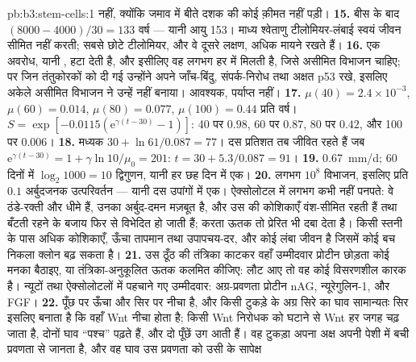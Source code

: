 \begin{solution}{pb:b3:stem-cells:1}
नहीं, क्योंकि जमाव में बीते दशक की कोई क़ीमत नहीं पड़ी।
\textbf{15.} बीस के बाद $(8000 - 4000)/30 = 133$ वर्ष --- यानी आयु 153।
माध्य श्वेताणु टीलोमियर-लंबाई स्वयं जीवन सीमित नहीं करती; सबसे छोटे
टीलोमियर, और वे दूसरे लक्षण, अधिक मायने रखते हैं।
\textbf{16.}  एक अवरोध, यानी , हटा देती है, और
इसीलिए वह लगभग हर  में मिलती है, जिसे असीमित विभाजन चाहिए; पर
जिन तंतुकोरकों को  दी गई उन्होंने अपने जाँच-बिंदु, संपर्क-निरोध
तथा अक्षत p53 रखे, इसलिए अकेले असीमित विभाजन ने उन्हें  नहीं
बनाया। आवश्यक, पर्याप्त नहीं।
\textbf{17.} $\mu(40) = 2.4\times 10^{-3}$, $\mu(60) = 0.014$, $\mu(80) =
0.077$, $\mu(100) = 0.44$ प्रति वर्ष। $S = \exp[-0.0115(\mathrm{e}^{\gamma
(t-30)} - 1)]$: 40 पर $0.98$, 60 पर $0.87$, 80 पर $0.42$, और 100 पर
$0.006$।
\textbf{18.} मध्यक $30 + \ln 61/0.087 = 77$। दस प्रतिशत तब जीवित रहते
हैं जब $\mathrm{e}^{\gamma(t-30)} = 1 + \gamma\ln 10/\mu_{0} = 201$: $t = 30 +
5.3/0.087 = 91$।
\textbf{19.} \qty{0.67}{mm/d}; 60 दिनों में $\log_{2}1000 = 10$
द्विगुणन, यानी हर छह दिन में एक।
\textbf{20.} लगभग $10^{8}$ विभाजन, इसलिए प्रति  $0.1$ अर्बुदजनक
उत्परिवर्तन --- यानी दस उपांगों में एक। ऐक्सोलोटल में  लगभग कभी
नहीं पनपते: वे ठंडे-रक्ती और धीमे हैं, उनका अर्बुद-दमन मज़बूत है, और
उस  की कोशिकाएँ वंश-सीमित रहती हैं तथा बँटती रहने के बजाय फिर
से विभेदित हो जाती हैं;  करता ऊतक तो प्रेरित  भी दबा देता
है। किसी स्तनी के पास अधिक कोशिकाएँ, ऊँचा तापमान तथा उपापचय-दर, और कोई
लंबा जीवन है जिसमें कोई बच निकला क्लोन बढ़ सकता है।
\textbf{21.} उस ठूँठ की तंत्रिका काटकर वहाँ उम्मीदवार प्रोटीन छोड़ता कोई
मनका बैठाइए, या तंत्रिका-अनुकूलित ऊतक कलमित कीजिए:  लौट आए तो
वह कोई विसरणशील कारक है। न्यूटों तथा ऐक्सोलोटलों में पहचाने गए
उम्मीदवार: अग्र-प्रवणता प्रोटीन nAG, न्यूरेगुलिन-1, और FGF।
\textbf{22.}  पूँछ पर ऊँचा और सिर पर नीचा है, और किसी टुकड़े
के अग्र सिरे का घाव सामान्यतः सिर इसलिए बनाता है कि वहाँ Wnt नीचा होता
है; किसी Wnt निरोधक को घटाने से Wnt हर जगह चढ़ जाता है, दोनों घाव
``पश्च'' पढ़ते हैं, और दो पूँछें उग आती हैं। वह टुकड़ा अपना अक्ष अपनी
पेशी में बची प्रवणता से जानता है, और वह घाव उस प्रवणता को उसी के सापेक्ष

\end{solution}
